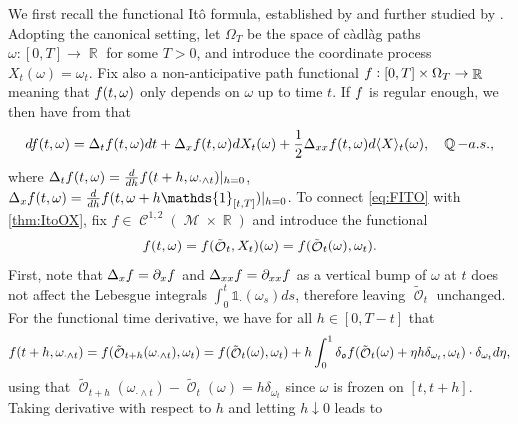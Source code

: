 \documentclass[11pt]{article}
\def\mo{\mathfrak{o}}
\theoremstyle{plain}
\theoremstyle{definition}
\DeclareMathOperator{\Q}{\mathbb{Q}}
\DeclareMathOperator{\R}{\mathbb{R}}
\DeclareMathOperator{\calC}{\mathcal{C}}
\DeclareMathOperator{\calM}{\mathcal{M}}
\DeclareMathOperator{\calO}{\mathcal{O}}
\begin{document}
We first recall the functional It\^o formula, established by \citet{DupireFITO} and further studied   by  \citet{ContBally, ContFournie}. Adopting the canonical setting, let  $\Omega_T$ be the space of càdlàg paths  $\omega:[0,T] \to \R$ for some $T>0$, and introduce the coordinate process $X_t(\omega) = \omega_t$.  Fix also a non-anticipative path functional $\textnormal{f}:[0,T]\times \Omega_T \to \R$ meaning that $\textnormal{f}(t,\omega)$ only depends on $\omega$ up to time $t$.  If $\textnormal{f}$ is regular enough, we then have from \cite{DupireFITO} that 
     \begin{equation}\label{eq:FITO}
        d\textnormal{f}(t,\omega) = \Delta_t\textnormal{f}(t,\omega)dt  %
        + \Delta_{x}\textnormal{f}(t,\omega) dX_t(\omega) +   \frac{1}{2}\Delta_{xx} \textnormal{f}(t,\omega) d\langle X \rangle_t(\omega),  \quad \Q-a.s.,
    \end{equation}
    where   $\Delta_t\textnormal{f}(t,\omega) = \frac{d}{dh} \textnormal{f}(t+h,\omega_{\cdot \wedge t})|_{h=0}$,  $\Delta_x\textnormal{f}(t,\omega) = \frac{d}{dh} \textnormal{f}(t,\omega + h \mathds{1}_{[t,T]})|_{h=0}$. 
To connect \eqref{eq:FITO} with \cref{thm:ItoOX}, fix $f \in \calC^{1,2}(\calM\times \R)$ and introduce the functional 
 $$\textnormal{f}(t,\omega) = f(\tilde{\calO}_t,X_t)(\omega) = f(\tilde{\calO}_t(\omega),\omega_t).$$ 
 First, note that  $\Delta_x \textnormal{f} = \partial_x f$ and $\Delta_{xx}\textnormal{f} = \partial_{xx} f$ 
as a vertical bump of $\omega$ at $t$ does not affect the Lebesgue integrals $\int_0^t \mathds{1}_{\cdot} (\omega_s)ds$, therefore leaving $\tilde{\calO}_t$ unchanged.   
For the functional time derivative, we have for all $h\in [0,T-t]$ that 
\begin{align*}
\textnormal{f}(t+h,\omega_{\cdot \wedge t}) = f(\tilde{\calO}_{t+h}(\omega_{\cdot \wedge t}), \omega_t)  
= f(\tilde{\calO}_{t}(\omega), \omega_t) + h\int_0^1  \delta_\mo  f(\tilde{\calO}_t(\omega) + \eta h \delta_{\omega_t},\omega_t) \cdot \delta_{\omega_t} d\eta, %
\end{align*}
using that $\tilde{\calO}_{t+h}(\omega_{\cdot \wedge t}) - \tilde{\calO}_{t}(\omega) = h\delta_{\omega_t}$ since $\omega$ is frozen on $[t,t+h]$.  Taking derivative with respect to $h$ and letting $h\downarrow 0$ leads to 
\end{document}
